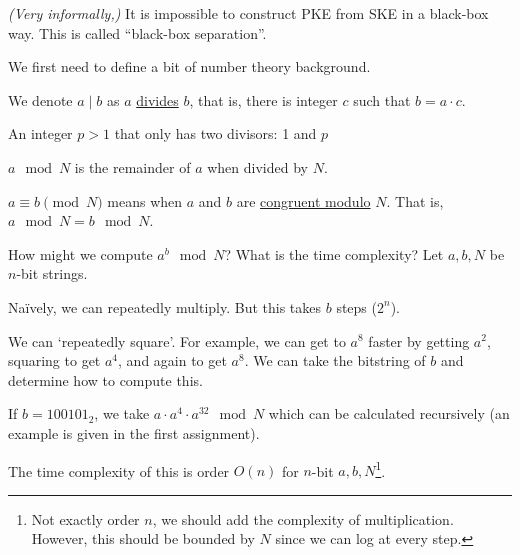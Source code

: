 \begin{theorem}
    \emph{(Very informally,)} It is impossible to construct PKE from SKE in a black-box way. This is called ``black-box separation''.
\end{theorem}

We first need to define a bit of number theory background.
\begin{definition}
    We denote $a\mid b$ as $a$ \ul{divides} $b$, that is, there is integer $c$ such that $b = a\cdot c$.
\end{definition}
\begin{definition}[Primes]
    An integer $p > 1$ that only has two divisors: 1 and $p$
\end{definition}
\begin{definition}[Mod]
    $a\mod{N}$ is the remainder of $a$ when divided by $N$.

    $a\equiv b\pmod{N}$ means when $a$ and $b$ are \ul{congruent modulo} $N$. That is, $a\mod N = b\mod N$.
\end{definition}

\begin{ques*}
    How might we compute $a^b\mod N$? What is the time complexity? Let $a, b, N$ be $n$-bit strings.
\end{ques*}

Na\"ively, we can repeatedly multiply. But this takes $b$ steps ($2^n$).

We can `repeatedly square'. For example, we can get to $a^8$ faster by getting $a^2$, squaring to get $a^4$, and again to get $a^8$. We can take the bitstring of $b$ and determine how to compute this.

\begin{example*}
    If $b = 100101_2$, we take $a\cdot a^4\cdot a^{32}\mod N$ which can be calculated recursively (an example is given in the first assignment).
\end{example*}

The time complexity of this is order $O(n)$ for $n$-bit $a, b, N$\footnote{Not exactly order $n$, we should add the complexity of multiplication. However, this should be bounded by $N$ since we can log at every step.}.

